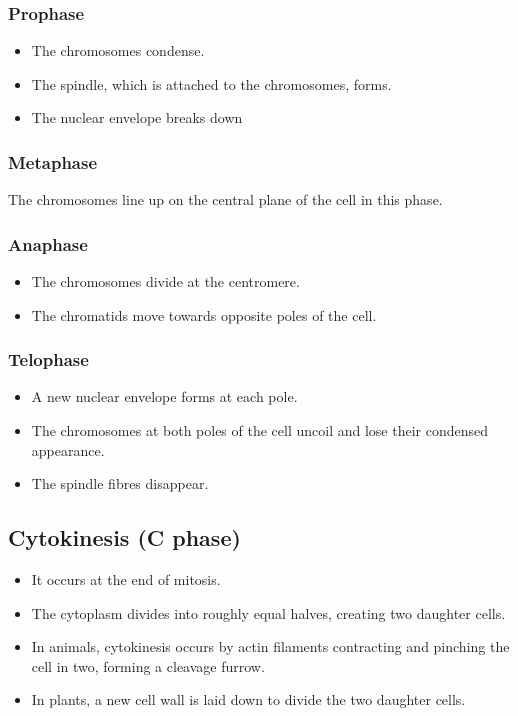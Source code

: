 \documentclass[11pt]{article}
\begin{document}
\subsubsection{Prophase}
\label{sec:orgebc94a5}
\begin{itemize}
\item The chromosomes condense.
\item The spindle, which is attached to the chromosomes, forms.
\item The nuclear envelope breaks down
\end{itemize}
\subsubsection{Metaphase}
\label{sec:orgeefdadc}
The chromosomes line up on the central plane of the cell in this phase.
\subsubsection{Anaphase}
\label{sec:org1ca32d4}
\begin{itemize}
\item The chromosomes divide at the centromere.
\item The chromatids move towards opposite poles of the cell.
\end{itemize}
\subsubsection{Telophase}
\label{sec:org9bc9119}
\begin{itemize}
\item A new nuclear envelope forms at each pole.
\item The chromosomes at both poles of the cell uncoil and lose their condensed appearance.
\item The spindle fibres disappear.
\end{itemize}
\subsection{Cytokinesis (C phase)}
\label{sec:orgf785dd1}
\begin{itemize}
\item It occurs at the end of mitosis.
\item The cytoplasm divides into roughly equal halves, creating two daughter cells.
\item In animals, cytokinesis occurs by actin filaments contracting and pinching the cell in two, forming a cleavage furrow.
\item In plants, a new cell wall is laid down to divide the two daughter cells.
\end{itemize}
\end{document}
